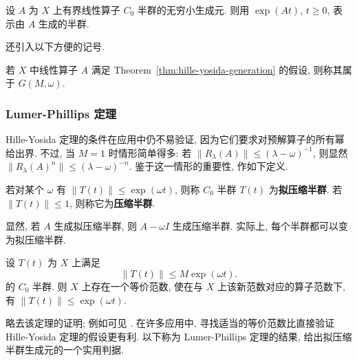 \begin{Definition}
\label{def:semigroup-exponential-notation}
设 $A$ 为 $X$ 上有界线性算子 $C_0$ 半群的无穷小生成元. 则用 $\exp(At)$, $t\geq0$, 表示由 $A$ 生成的半群.
\end{Definition}

还引入以下方便的记号.

\begin{Definition}
\label{def:semigroup-generator-class}
若 $X$ 中线性算子 $A$ 满足 Theorem~\ref{thm:hille-yosida-generation} 的假设, 则称其属于 $G(M,\omega)$.
\end{Definition}

\subsubsection{Lumer-Phillips 定理}\label{subsec:lumer-phillips-theorem}

Hille-Yosida 定理的条件在应用中仍不易验证, 因为它们要求对预解算子的所有幂给出界. 不过, 当 $M=1$ 时情形简单得多: 若 $\|R_\lambda(A)\|\leq(\lambda-\omega)^{-1}$, 则显然 $\|R_\lambda(A)^n\|\leq(\lambda-\omega)^{-n}$. 鉴于这一情形的重要性, 作如下定义.

\begin{Definition}
\label{def:quasicontraction-contraction-semigroup}
若对某个 $\omega$ 有 $\|T(t)\|\leq\exp(\omega t)$, 则称 $C_0$ 半群 $T(t)$ 为\textbf{拟压缩半群}. 若 $\|T(t)\|\leq1$, 则称它为\textbf{压缩半群}.
\end{Definition}

显然, 若 $A$ 生成拟压缩半群, 则 $A-\omega I$ 生成压缩半群. 实际上, 每个半群都可以变为拟压缩半群.

\begin{Theorem}
\label{thm:semigroup-equivalent-quasicontraction-norm}
设 $T(t)$ 为 $X$ 上满足
\begin{equation}\label{eq:semigroup-equivalent-quasicontraction-norm-growth-hypothesis}
\|T(t)\|\leq M\exp(\omega t).
\end{equation}
的 $C_0$ 半群. 则 $X$ 上存在一个等价范数, 使在与 $X$ 上该新范数对应的算子范数下, 有 $\|T(t)\|\leq\exp(\omega t)$.
\end{Theorem}

略去该定理的证明; 例如可见 \cite{Pa}. 在许多应用中, 寻找适当的等价范数比直接验证 Hille-Yosida 定理的假设更有利. 以下称为 Lumer-Phillips 定理的结果, 给出拟压缩半群生成元的一个实用判据.

